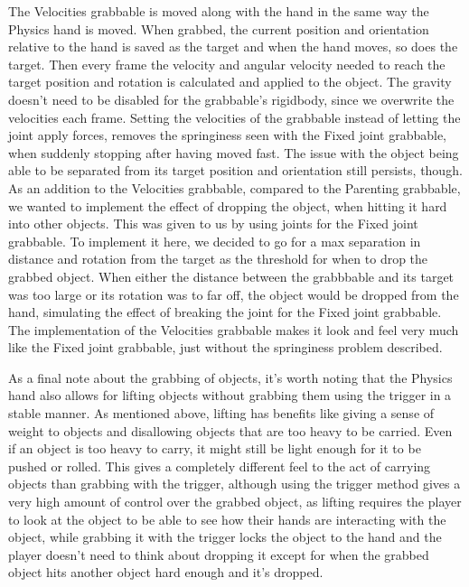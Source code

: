 The Velocities grabbable is moved along with the hand in the same way the Physics hand is moved. When grabbed, the current position and orientation relative to the hand is saved as the target and when the hand moves, so does the target. Then every frame the velocity and angular velocity needed to reach the target position and rotation is calculated and applied to the object. The gravity doesn't need to be disabled for the grabbable's rigidbody, since we overwrite the velocities each frame. Setting the velocities of the grabbable instead of letting the joint apply forces, removes the springiness seen with the Fixed joint grabbable, when suddenly stopping after having moved fast. The issue with the object being able to be separated from its target position and orientation still persists, though. As an addition to the Velocities grabbable, compared to the Parenting grabbable, we wanted to implement the effect of dropping the object, when hitting it hard into other objects. This was given to us by using joints for the Fixed joint grabbable. To implement it here, we decided to go for a max separation in distance and rotation from the target as the threshold for when to drop the grabbed object. When either the distance between the grabbbable and its target was too large or its rotation was to far off, the object would be dropped from the hand, simulating the effect of breaking the joint for the Fixed joint grabbable. The implementation of the Velocities grabbable makes it look and feel very much like the Fixed joint grabbable, just without the springiness problem described.

As a final note about the grabbing of objects, it's worth noting that the Physics hand also allows for lifting objects without grabbing them using the trigger in a stable manner. As mentioned above, lifting has benefits like giving a sense of weight to objects and disallowing objects that are too heavy to be carried. Even if an object is too heavy to carry, it might still be light enough for it to be pushed or rolled. This gives a completely different feel to the act of carrying objects than grabbing with the trigger, although using the trigger method gives a very high amount of control over the grabbed object, as lifting requires the player to look at the object to be able to see how their hands are interacting with the object, while grabbing it with the trigger locks the object to the hand and the player doesn't need to think about dropping it except for when the grabbed object hits another object hard enough and it's dropped.

